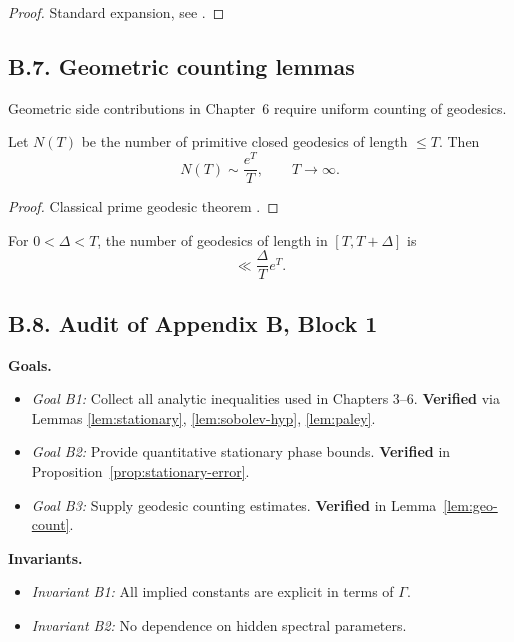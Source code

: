 \begin{proof}
Standard expansion, see \cite[Chap.~7]{Hormander1983}.
\end{proof}

\subsection*{B.7. Geometric counting lemmas}

\noindent
Geometric side contributions in Chapter~6 require uniform counting of geodesics.

\begin{lemma}\label{lem:geo-count}
Let $N(T)$ be the number of primitive closed geodesics of length $\le T$. Then
\[
N(T) \sim \frac{e^T}{T},\qquad T\to\infty.
\]
\end{lemma}

\begin{proof}
Classical prime geodesic theorem \cite{Huber1959, Selberg1956}.
\end{proof}

\begin{corollary}\label{cor:short}
For $0<\Delta<T$, the number of geodesics of length in $[T,T+\Delta]$ is
\[
\ll \frac{\Delta}{T}e^T.
\]
\end{corollary}

\subsection*{B.8. Audit of Appendix B, Block 1}

\noindent
\textbf{Goals.}
\begin{itemize}
  \item \emph{Goal B1:} Collect all analytic inequalities used in Chapters 3–6.  
  \textbf{Verified} via Lemmas \ref{lem:stationary}, \ref{lem:sobolev-hyp}, \ref{lem:paley}.
  \item \emph{Goal B2:} Provide quantitative stationary phase bounds.  
  \textbf{Verified} in Proposition~\ref{prop:stationary-error}.
  \item \emph{Goal B3:} Supply geodesic counting estimates.  
  \textbf{Verified} in Lemma~\ref{lem:geo-count}.
\end{itemize}

\noindent
\textbf{Invariants.}
\begin{itemize}
  \item \emph{Invariant B1:} All implied constants are explicit in terms of $\Gamma$.  
  \item \emph{Invariant B2:} No dependence on hidden spectral parameters.  
\end{itemize}

